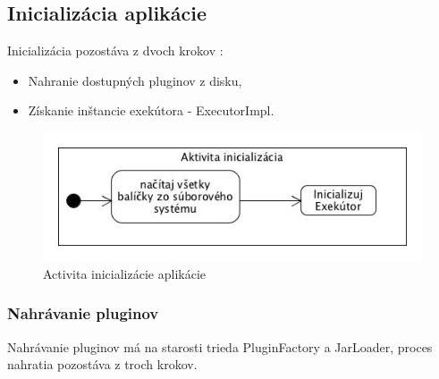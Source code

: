 \subsection{Inicializácia aplikácie}
\indent Inicializácia pozostáva z dvoch krokov :
\begin{itemize}
	\item Nahranie dostupných pluginov z disku,
	\item Získanie inštancie exekútora - ExecutorImpl.
\end{itemize}
\begin{figure}[!htbp]
	\centering
	\includegraphics[scale=0.8]{img/initialization.jpg}
	\caption{Activita inicializácie aplikácie}
	\label{fig:test}
\end{figure}
\subsubsection{Nahrávanie pluginov}
\indent Nahrávanie pluginov má na starosti trieda PluginFactory a JarLoader, proces nahratia pozostáva z troch krokov.\newline
